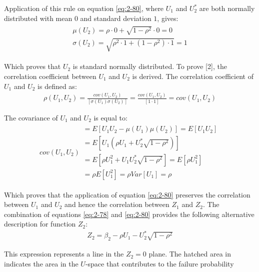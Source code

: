 Application of this rule on equation \eqref{eq:2-80}, where $U_1$ and $U_2^{*}$ are both normally distributed with mean $0$ and standard deviation $1$, gives:
\begin{align}
\begin{array}{l} {\mu(U_2) =\rho \cdot 0+\sqrt{1-\rho ^{2} } \cdot 0=0} \\ {\sigma (U_2) =\sqrt{\rho ^{2} \cdot 1+\left(1-\rho ^{2} \right)\cdot 1} =1} \end{array}\label{0.79)} 
\end{align}

Which proves that $U_2$ is standard normally distributed. To prove [2], the correlation coefficient between $U_1$ and $U_2$ is derived. The correlation coefficient of $U_1$ and $U_2$ is defined as:
\begin{align}
\rho \left(U_{1} ,U_{2} \right)=\frac{cov\left(U_{1} ,U_{2} \right)}{\left[\sigma \left(U_{1} \right)\sigma \left(U_{2} \right)\right]} =\frac{cov\left(U_{1} ,U_{2} \right)}{\left[1\cdot 1\right]} =cov\left(U_{1} ,U_{2} \right)\label{0.80)} 
\end{align}

The covariance of $U_1$ and $U_2$ is equal to:
\begin{align}
cov\left(U_{1} ,U_{2} \right) \begin{array}{l} {=E\left[U_{1} U_{2} -\mu \left(U_{1} \right)\mu \left(U_{2} \right)\right]=E\left[U_{1} U_{2} \right]} \\ {=E\left[U_{1} \left(\rho  U_{1} +U_{2}^{*} \sqrt{1-\rho ^{2} } \right)\right]} \\ {=E\left[\rho U_{1}^{2} +U_{1} U_{2}^{*} \sqrt{1-\rho ^{2} } \right]=E\left[\rho U_{1}^{2} \right]} \\ {=\rho E\left[U_{1}^{2} \right]=\rho Var\left[U_{1} \right]=\rho } \end{array}\label{0.81)} 
\end{align}

Which proves that the application of equation \eqref{eq:2-80} preserves the correlation between $U_1$ and $U_2$ and hence the correlation between $Z_1$ and $Z_2$. The combination of equations \eqref{eq:2-78} and \eqref{eq:2-80} provides the following alternative description for function $Z_2$:
\begin{align}
Z_{2} =\beta _{2} -\rho U_{1} -U_{2}^{*} \sqrt{1-\rho ^{2} } \label{ZEqnNum229315} 
\end{align}

This expression represents a line in the $Z_2=0$ plane. The hatched area in  indicates the area in the $U$-space that contributes to the failure probability 

